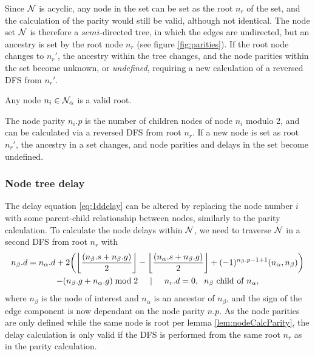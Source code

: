 Since $\mathcal{N}$ is acyclic, any node in the set can be set as the root $n_r$ of the set, and the calculation of the parity would still be valid, although not identical. The node set $\mathcal{N}$ is therefore a $semi$-directed tree, in which the edges are undirected, but an ancestry is set by the root node $n_r$ (see figure \ref{fig:parities}). If the root node changes to $n_{r}'$, the ancestry within the tree changes, and the node parities within the set become unknown, or \emph{undefined}, requiring a new calculation of a reversed DFS from $n_{r}'$.

\begin{lemma}\label{lem:anynoderoot}
  Any node $n_i \in \mathcal{N}_\alpha$ is a valid root.
\end{lemma}

\begin{lemma}\label{lem:nodeCalcParity}
  The node parity $n_i.p$ is the number of children nodes of node $n_i$ modulo 2, and can be calculated via a reversed DFS from root $n_r$. If a new node is set as root $n_r'$, the ancestry in a set changes, and node parities and delays in the set become undefined.
\end{lemma}

\subsubsection{Node tree delay}

The delay equation \ref{eq:1ddelay} can be altered by replacing the node number $i$ with some parent-child relationship between nodes, similarly to the parity calculation. To calculate the node delays within $\mathcal{N}$, we need to traverse $\mathcal{N}$ in a second DFS from root $n_r$ with
\begin{multline}\label{eq:2ddelay}
  n_\beta.d = n_\alpha.d + 2\bigg({\left \lfloor \frac{(n_\beta.s+n_\beta.g)}{2} \right \rfloor } - {\left \lfloor \frac{(n_\alpha.s+n_\beta.g)}{2} \right \rfloor } + (-1)^{n_\beta.p-1+1}(n_\alpha,n_\beta)\bigg) \\
         - (n_\beta.g + n_\alpha.g)\bmod 2 \hspace{.5cm} | \hspace{.5cm} n_r.d = 0, \hspace{.2cm} n_\beta \mbox{ child of } n_\alpha,
\end{multline}
where $n_\beta$ is the node of interest and $n_\alpha$ is an ancestor of $n_\beta$, and the sign of the edge component is now dependant on the node parity $n.p$. As the node parities are only defined while the same node is root per lemma \ref{lem:nodeCalcParity}, the delay calculation is only valid if the DFS is performed from the same root $n_r$ as in the parity calculation.


